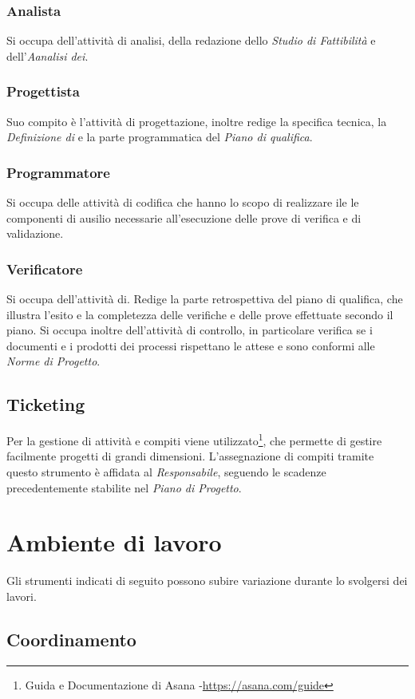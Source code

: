 \subsubsection{Analista} Si occupa dell'attività di analisi, della redazione dello \textit{Studio di Fattibilità} e dell'\textit{Aanalisi dei}.
\subsubsection{Progettista} Suo compito è l'attività di progettazione, inoltre redige la specifica tecnica, la \textit{Definizione di} e la parte programmatica del \textit{Piano di qualifica}. 
\subsubsection{Programmatore} Si occupa delle attività di codifica che hanno lo scopo di realizzare ile le componenti di ausilio necessarie all'esecuzione delle prove di verifica e di validazione.
\subsubsection{Verificatore} Si occupa dell'attività di. Redige la parte retrospettiva del piano di qualifica, che illustra l'esito e la completezza delle verifiche e delle prove effettuate secondo il piano. Si occupa  inoltre dell'attività di controllo, in particolare verifica se i documenti e i prodotti dei processi rispettano le attese e sono conformi alle \textit{Norme di Progetto}. 

\subsection{Ticketing}
Per la gestione di attività e compiti viene utilizzato\footnote{Guida e Documentazione di Asana -\url{https://asana.com/guide}}, che permette di gestire facilmente progetti di grandi dimensioni.
L'assegnazione di compiti tramite questo strumento è affidata al \textit{Responsabile}, seguendo le scadenze precedentemente stabilite nel \textit{Piano di Progetto}.

\section{Ambiente di lavoro}
Gli strumenti indicati di seguito possono subire variazione durante lo svolgersi dei lavori.
\subsection{Coordinamento}
